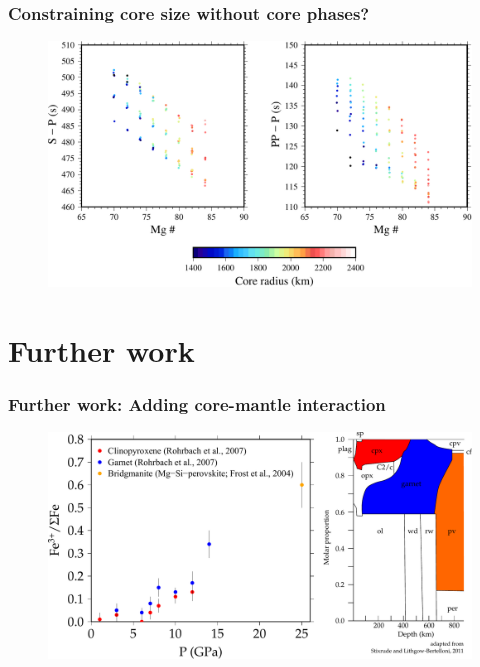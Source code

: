 \documentclass[compress,framenumber]{beamer}
\begin{document}
\begin{frame}
  \frametitle{Constraining core size without core phases?}
  \vspace{-2.0em}
  \begin{figure}
    \includegraphics[width=0.9\linewidth]{figures/PP_SP_differential_times_coresize.pdf}
  \end{figure}
\end{frame}

\section{Further work}

\begin{frame}
  \frametitle{Further work: Adding core-mantle interaction}
  \vspace{-2.0em}
  \begin{figure}
    \includegraphics[width=0.8\linewidth]{figures/ferric_depth_combined.pdf}
  \end{figure}
\end{frame}
\end{document}
